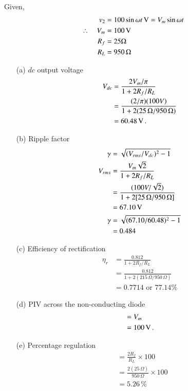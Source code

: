 \begin{solution}
Given, 
\begin{align*}
v_2 & = 100 \sin \omega t \operatorname{\mathrm{V}} = V_m \sin \omega t\\
\therefore\quad V_m & = 100 \operatorname{\mathrm{V}}\\
R_f & = 25 \Omega\\
R_L & = 950\, \Omega
\end{align*}
\begin{itemize}
\item[(a)] $dc$ output voltage 
\begin{align*}
V_{dc} &= \frac{2V_m/\pi}{1 + 2 R_f /R_L}\\
& = \frac{(2/\pi) (100 V)}{1 + 2 (25\, \Omega / 950\, \Omega)}\\
& = 60.48 \operatorname{\mathrm{V}}.
\end{align*}
 
\item[(b)] Ripple factor 
\begin{align*}
\gamma &  = \sqrt{(V_{rms} / V_{dc})^2  -1}\\
V_{rms}& = \frac{V_m \sqrt{2}}{1 + 2 R_f / R_L}\\
& = \frac{(100 V/\sqrt{2})}{1 + 2 [25\,\Omega /950\,\Omega]}\\
& = 67.10 \operatorname{\mathrm{V}}\\
\gamma & = \sqrt{(67.10/60.48)^2 -1}\\
& = 0.484
\end{align*}
 
\item[(c)] Efficiency of rectification
\begin{align*}
\eta_r & = \frac{0.812}{1+2 R_f / R_L}\\
& = \frac{0.812}{1+2 (215 \,\Omega / 950\, \Omega)}\\
& = 0.7714 \text{ or } 77.14 \% 
\end{align*}
 
\item[(d)] PIV across the non-conducting diode 
\begin{align*}
& = V_m\\
& = 100 \operatorname{\mathrm{V}}.
\end{align*}

\item[(e)] Percentage regulation
\begin{align*}
& = \frac{2 R_f}{R_L} \times 100\\
& = \frac{2(25\,\Omega)}{950\,\Omega} \times 100\\
& = 5.26\,\%
\end{align*}


\end{itemize}
\end{solution}
